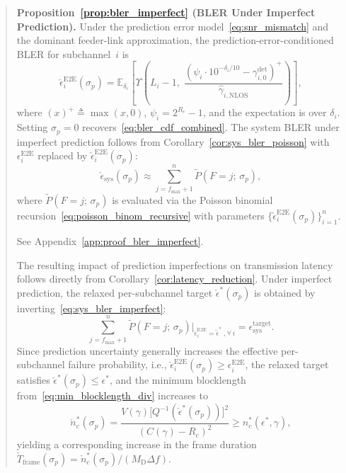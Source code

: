 \begin{quote}
{\noindent\textbf{Proposition~\ref{prop:bler_imperfect} (BLER Under Imperfect Prediction).}
Under the prediction error model~\eqref{eq:snr_mismatch}
and the dominant feeder-link approximation,
the prediction-error-conditioned BLER for subchannel~$i$ is
\begin{equation*}
\check{\epsilon}_i^{\mathrm{E2E}}(\sigma_p)
= \mathbb{E}_{\delta_i}\!\left[
\Upsilon\!\left(L_i - 1,\;
\frac{\left(\psi_i\cdot 10^{-\delta_i/10}
  - \gamma_{i,0}^{\mathrm{det}}\right)^{+}}
{\hat{\gamma}_{i,\mathrm{NLOS}}}\right)\right],
\end{equation*}
where $(x)^{+} \triangleq \max(x,0)$,
$\psi_i = 2^{R_c} - 1$, and the expectation is over
$\delta_i$.
Setting $\sigma_p = 0$
recovers~\eqref{eq:bler_cdf_combined}.
The system BLER under imperfect prediction follows from
Corollary~\ref{cor:sys_bler_poisson} with
$\epsilon_i^{\mathrm{E2E}}$ replaced by
$\check{\epsilon}_i^{\mathrm{E2E}}(\sigma_p)$:
\begin{equation*}
\check{\epsilon}_{\mathrm{sys}}(\sigma_p)
\approx \sum_{j=f_{\max}+1}^{n}
\tilde{P}(F = j;\,\sigma_p),
\end{equation*}
where $\tilde{P}(F = j;\,\sigma_p)$ is evaluated via the
Poisson binomial recursion~\eqref{eq:poisson_binom_recursive}
with parameters
$\{\check{\epsilon}_i^{\mathrm{E2E}}(\sigma_p)\}_{i=1}^{n}$.

\begin{IEEEproof}
{\color{blue}See Appendix~\ref{app:proof_bler_imperfect}.}
\end{IEEEproof}

The resulting impact of prediction imperfections on transmission latency
follows directly from
Corollary~\ref{cor:latency_reduction}.
Under imperfect prediction, the relaxed per-subchannel
target $\check{\epsilon}^{*}(\sigma_p)$ is obtained by
inverting~\eqref{eq:sys_bler_imperfect}:
\begin{equation*}
\sum_{j=f_{\max}+1}^{n}
\tilde{P}(F=j;\,\sigma_p)\big|_{\check{\epsilon}_i^{\mathrm{E2E}}
= \tilde{\epsilon}^{*}\;,\forall\, i}
= \epsilon_{\mathrm{sys}}^{\mathrm{target}}.
\end{equation*}
Since prediction uncertainty generally increases the effective per-subchannel failure probability, i.e.,
$\check{\epsilon}_i^{\mathrm{E2E}}(\sigma_p) \geq
\epsilon_i^{\mathrm{E2E}}$, the relaxed target satisfies
$\check{\epsilon}^{*}(\sigma_p) \leq \epsilon^{*}$,
and the minimum blocklength
from~\eqref{eq:min_blocklength_div} increases to
\begin{equation*}
\check{n}_c^{*}(\sigma_p)
= \frac{V(\gamma)\bigl[Q^{-1}
(\check{\epsilon}^{*}(\sigma_p))\bigr]^2}
{(C(\gamma) - R_c)^2}
\geq n_c^{*}(\epsilon^{*}, \gamma),
\end{equation*}
yielding a corresponding increase in the frame duration
$\check{T}_{\mathrm{frame}}(\sigma_p) =
\check{n}_c^{*}(\sigma_p)/(M_{\mathrm{D}}\Delta f)$.
}%

\end{quote}

